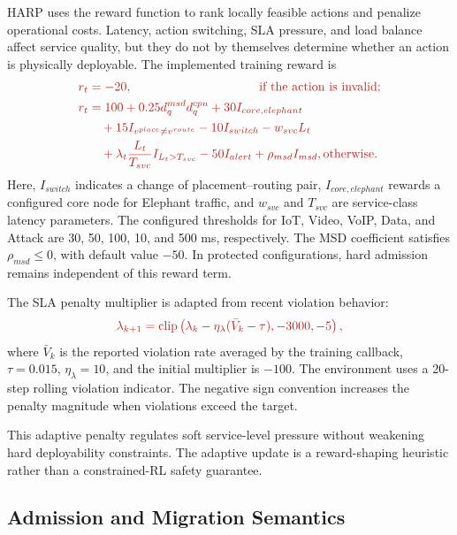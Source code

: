 \documentclass[final,5p]{elsarticle}
\newcommand{\rev}[1]{\textcolor{BrickRed}{#1}}
\begin{document}
HARP uses the reward function \rev{to rank locally feasible actions and penalize operational costs}. Latency, \rev{action switching}, SLA pressure, and load balance affect service quality, but they do not by themselves determine whether an action is physically deployable. \rev{The implemented training reward is}
\begin{equation}
\rev{\begin{aligned}
r_t&=-20, \hspace{36mm} \text{if the action is invalid};\\
r_t&=100+0.25d_q^{msd}d_q^{cpu}+30I_{core,elephant}\\
&\quad+15I_{v^{place}\ne v^{route}}-10I_{switch}-w_{svc}L_t\\
&\quad+\lambda_t\frac{L_t}{T_{svc}}I_{L_t>T_{svc}}-50I_{alert}+\rho_{msd}I_{msd}, \text{otherwise}.
\end{aligned}}
\label{eq:harp_reward}
\end{equation}
\rev{Here, \(I_{switch}\) indicates a change of placement--routing pair, \(I_{core,elephant}\) rewards a configured core node for Elephant traffic, and \(w_{svc}\) and \(T_{svc}\) are service-class latency parameters. The configured thresholds for IoT, Video, VoIP, Data, and Attack are 30, 50, 100, 10, and 500 ms, respectively. The MSD coefficient satisfies \(\rho_{msd}\le0\), with default value \(-50\). In protected configurations, hard admission remains independent of this reward term.}

The SLA penalty multiplier is adapted from recent violation behavior:
\begin{equation}
\rev{\lambda_{k+1}=\mathrm{clip}\left(\lambda_k-\eta_\lambda(\bar{V}_k-\tau),-3000,-5\right),}
\label{eq:lambda_update}
\end{equation}
\rev{where \(\bar V_k\) is the reported violation rate averaged by the training callback, \(\tau=0.015\), \(\eta_\lambda=10\), and the initial multiplier is \(-100\). The environment uses a 20-step rolling violation indicator. The negative sign convention increases the penalty magnitude when violations exceed the target.}

This adaptive penalty regulates soft service-level pressure without weakening hard deployability constraints. \rev{The adaptive update is a reward-shaping heuristic rather than a constrained-RL safety guarantee. }

\subsection{Admission and Migration Semantics}
\label{subsec:harp_admission}
\end{document}
